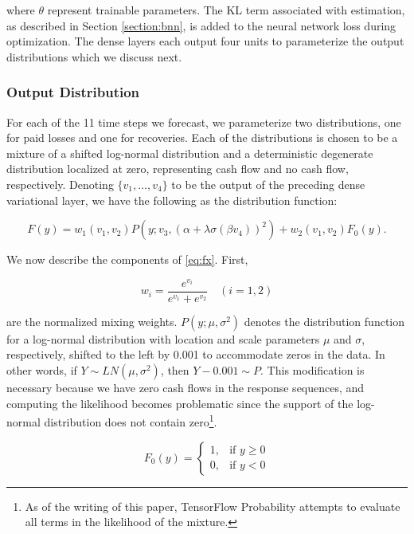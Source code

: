 \documentclass{article}
\begin{document}
where $\theta$ represent trainable parameters. The KL term associated with
estimation, as described in Section \ref{section:bnn}, is added to the neural 
network loss during optimization. The dense layers each output four units to 
parameterize the output distributions which we discuss next.

\subsubsection{Output Distribution}\label{section:outputdist}

For each of the 11 time steps we forecast, we parameterize two distributions, 
one for paid losses and one for recoveries. Each of the distributions is chosen 
to be a mixture of a shifted log-normal distribution and a deterministic 
degenerate distribution localized at zero, representing cash flow and no cash 
flow, respectively. Denoting $\{v_1,\dots,v_4\}$ to be the output of the 
preceding dense variational layer, we have the following as the distribution 
function:

\begin{equation} \label{eq:fx}
    F(y) = w_1(v_1, v_2)P(y; v_3, (\alpha + \lambda\sigma(\beta v_4))^2) + w_2(v_1, v_2)F_0(y).
\end{equation}

We now describe the components of \ref{eq:fx}. First, 

\begin{equation}
    w_i = \frac{e^{v_i}}{e^{v_1} + e^{v_2}}\quad (i = 1, 2)
\end{equation}

are the normalized mixing weights. $P(y; \mu, \sigma^2)$ denotes the 
distribution function for a log-normal distribution with location and scale 
parameters $\mu$ and $\sigma$, respectively, shifted to the left by 0.001 to 
accommodate zeros in the data. In other words, if $Y \sim LN(\mu, \sigma^2)$, 
then $Y - 0.001 \sim P$. This modification is necessary because we have zero 
cash flows in the response sequences, and computing the likelihood becomes
problematic since the support of the log-normal distribution does not contain
zero\footnote{As of the writing of this paper, TensorFlow Probability attempts
to evaluate all terms in the likelihood of the mixture.}.

\begin{equation}
    F_{0}(y)=\left\{\begin{matrix} 1, & \mbox{if }y\ge 0 \\ 0, & \mbox{if }y<0 \end{matrix}\right.
\end{equation}
\end{document}
